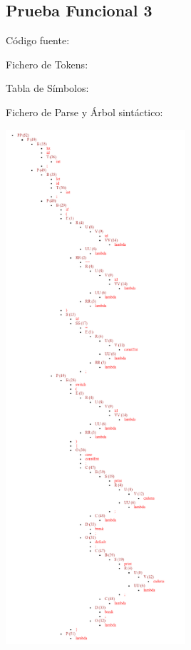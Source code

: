 \documentclass{article}[a4paper]
\begin{document}
\begin{appendices}
\subsection{Prueba Funcional 3}
Código fuente:

\hspace{\parindent} Fichero de Tokens:

\hspace{\parindent} Tabla de Símbolos:

\hspace{\parindent} Fichero de Parse y Árbol sintáctico:

\includegraphics[width=0.5\textwidth]{arbol3.png}


\end{appendices}
\end{document}
